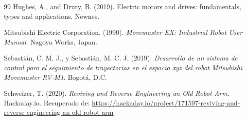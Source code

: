 \newpage
{} %
\begin{thebibliography}{99}
	Hughes, A., and Drury, B. (2019). Electric motors and drives: fundamentals, types and applications. Newnes.
	
	Mitsubishi Electric Corporation. (1990). \textit{Movemaster EX: Industrial Robot User Manual}. Nagoya Works, Japan.
	
	Sebastián, C. M. J., y Sebastián, M. C. J. (2019). \textit{Desarrollo de un sistema de control para el seguimiento de trayectorias en el espacio xyz del robot Mitsubishi Movemaster RV-M1}. Bogotá, D.C. 
	
	Schweizer, T. (2020). \textit{Reviving and Reverse Engineering an Old Robot Arm}. Hackaday.io. Recuperado de: \url{https://hackaday.io/project/171597-reviving-and-reverse-engineering-an-old-robot-arm}
	
\end{thebibliography}